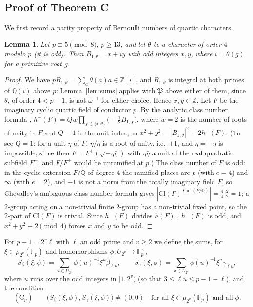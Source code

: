 \documentclass[11pt]{amsart}
\newtheorem{lemma}[theorem]{Lemma}
\theoremstyle{definition}
\theoremstyle{remark}
\providecommand{\Q}{\mathbb Q}
\providecommand{\Z}{\mathbb Z}
\providecommand{\F}{\mathbb F}
\newcommand{\fP}{\mathfrak P}
\DeclareMathOperator{\Gal}{Gal}
\numberwithin{equation}{section}
\begin{document}
\subsection{Proof of Theorem C}
We first record a parity property of Bernoulli numbers of quartic characters.

\begin{lemma}\label{lem:parity}
Let $p\equiv5\pmod 8$, $p\ge13$, and let $\theta$ be a character of order $4$ modulo $p$ (it is odd).
Then $B_{1,\theta}=x+iy$ with odd integers $x,y$, where $i=\theta(g)$ for a primitive root $g$.
\end{lemma}

\begin{proof}
We have $pB_{1,\theta}=\sum_a\theta(a)a\in\Z[i]$, and $B_{1,\theta}$ is integral at both primes of $\Q(i)$ above $p$: Lemma~\ref{lem:sums} applies with $\fP$ above either of them, since $\theta$, of order $4<p-1$, is not $\omega^{-1}$ for either choice. Hence $x,y\in\Z$.
Let $F$ be the imaginary cyclic quartic field of conductor $p$.
By the analytic class number formula \cite[Theorem~4.17]{Was97}, $h^-(F)=Qw\prod_{\chi\in\{\theta,\bar\theta\}}\bigl(-\tfrac12B_{1,\chi}\bigr)$, where $w=2$ is the number of roots of unity in $F$ and $Q=1$ is the unit index, so $x^2+y^2=|B_{1,\theta}|^2=2h^-(F)$.
(To see $Q=1$: for a unit $\eta$ of $F$, $\eta/\bar\eta$ is a root of unity, i.e.\ $\pm1$, and $\bar\eta=-\eta$ is impossible, since then $F=F^+(\sqrt{-\eta\bar\eta})$ with $\eta\bar\eta$ a unit of the real quadratic subfield $F^+$, and $F/F^+$ would be unramified at $p$.)
The class number of $F$ is odd: in the cyclic extension $F/\Q$ of degree $4$ the ramified places are $p$ (with $e=4$) and $\infty$ (with $e=2$), and $-1$ is not a norm from the totally imaginary field $F$, so Chevalley's ambiguous class number formula \cite{Che33} gives $|\mathrm{Cl}(F)^{\Gal(F/\Q)}|=\frac{4\cdot2}{4\cdot2}=1$; a $2$-group acting on a non-trivial finite $2$-group has a non-trivial fixed point, so the $2$-part of $\mathrm{Cl}(F)$ is trivial.
Since $h^-(F)$ divides $h(F)$ \cite[Theorem~4.10]{Was97}, $h^-(F)$ is odd, and $x^2+y^2\equiv2\pmod4$ forces $x$ and $y$ to be odd.
\end{proof}

For $p-1=2^v\ell$ with $\ell$ an odd prime and $v\ge2$ we define the sums, for $\xi\in\mu_{2^v}(\F_p)$ and homomorphisms $\phi:U_{2^v}\to\F_p^\times$,
\[
S_\beta(\xi,\phi)=\sum_{u\in U_{2^v}}\phi(u)^{-1}\xi^u\beta_{\ell u},\qquad
S_\gamma(\xi,\phi)=\sum_{u\in U_{2^v}}\phi(u)^{-1}\xi^u\gamma_{\ell u},
\]
where $u$ runs over the odd integers in $[1,2^v)$ (so that $3\le\ell u\le p-1-\ell$), and the condition
\[
(\mathrm C_p)\qquad\bigl(S_\beta(\xi,\phi),S_\gamma(\xi,\phi)\bigr)\ne(0,0)\quad\text{for all }\xi\in\mu_{2^v}(\F_p)\text{ and all }\phi .
\]
\end{document}
